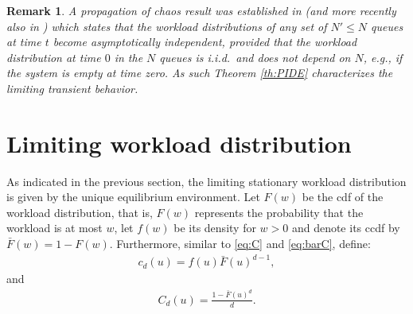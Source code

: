 \documentclass[12pt]{report}
\newtheorem{remark}{Remark}
\begin{document}
\begin{remark}
A propagation of chaos result was established in \cite[Section 7]{bramson2012asymptotic} (and more recently also in \cite{shneer2020large}) which
states that the workload distributions of any set of $N' \leq N$ queues 
at time $t$ become asymptotically independent, provided
that the workload distribution at time $0$ in the $N$ queues is i.i.d.~and does not depend on $N$, e.g., if the system is empty at time zero. As such Theorem \ref{th:PIDE} characterizes the limiting transient behavior.
\end{remark}

\section{Limiting workload distribution}\label{sec:workload}
As indicated in the previous section, the limiting stationary workload distribution is given by the unique equilibrium environment. Let $F(w)$ be the cdf of the workload distribution, that is, $F(w)$ represents the probability that the workload is at most
$w$, let $f(w)$ be its density for $w > 0$ and denote its ccdf by $\bar F(w) = 1-F(w)$. 
Furthermore, similar to \eqref{eq:C} and \eqref{eq:barC}, define:
\begin{align}
c_d(u) =  f(u)\bar{F}(u)^{d-1},
\end{align}
and
\begin{align}
C_d(u) = \frac{1 - \bar F(u)^d}{d}.
\end{align}
\end{document}
